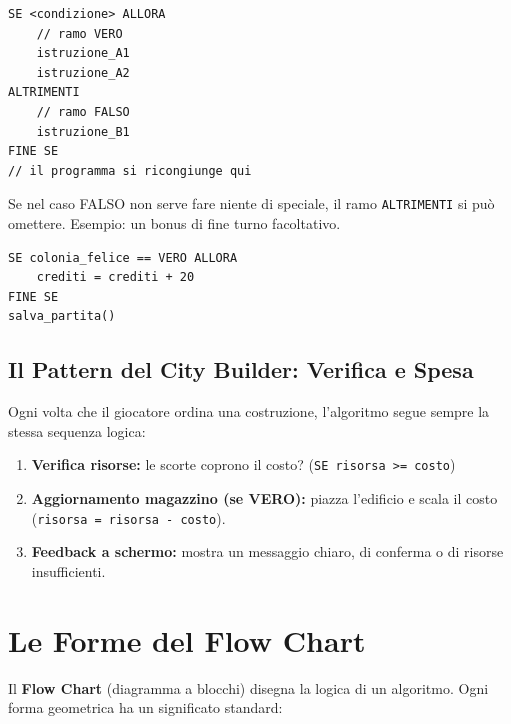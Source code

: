 \begin{lstlisting}
SE <condizione> ALLORA
    // ramo VERO
    istruzione_A1
    istruzione_A2
ALTRIMENTI
    // ramo FALSO
    istruzione_B1
FINE SE
// il programma si ricongiunge qui
\end{lstlisting}

\begin{consiglio}
Se nel caso FALSO non serve fare niente di speciale, il ramo \texttt{ALTRIMENTI} si può omettere. Esempio: un bonus di fine turno facoltativo.
\begin{lstlisting}
SE colonia_felice == VERO ALLORA
    crediti = crediti + 20
FINE SE
salva_partita()
\end{lstlisting}
\end{consiglio}

\subsection{Il Pattern del City Builder: Verifica e Spesa}

Ogni volta che il giocatore ordina una costruzione, l'algoritmo segue sempre la stessa sequenza logica:
\begin{enumerate}
  \item \textbf{Verifica risorse:} le scorte coprono il costo? (\texttt{SE risorsa >= costo})
  \item \textbf{Aggiornamento magazzino (se VERO):} piazza l'edificio e scala il costo (\texttt{risorsa = risorsa - costo}).
  \item \textbf{Feedback a schermo:} mostra un messaggio chiaro, di conferma o di risorse insufficienti.
\end{enumerate}

\section{Le Forme del Flow Chart}

Il \textbf{Flow Chart} (diagramma a blocchi) disegna la logica di un algoritmo. Ogni forma geometrica ha un significato standard:

